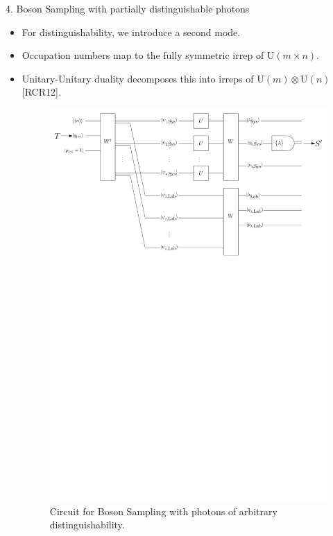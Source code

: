 \documentclass[]{templates/poster}
\begin{document}
\begin{frame}{}
\begin{columns}[t]
  \begin{column}{0.422\linewidth}
  
  \begin{block}{4. Boson Sampling with partially distinguishable photons}
  \begin{itemize}
  \item For distinguishability, we introduce a second mode.
  \item Occupation numbers map to the fully symmetric irrep of $\textrm{U}(m \times n)$.
  \item Unitary-Unitary duality decomposes this into irreps of $\textrm{U}(m)\otimes \textrm{U}(n)$ [RCR12].
  \begin{center}
  \begin{figure}
  \includegraphics[width=0.75\linewidth]{noisy_circuit_rep2}
  \caption{\label{fig:noisy-circuit} Circuit for Boson Sampling with photons of arbitrary distinguishability.}
  \end{figure}
  \end{center}
  \end{itemize}
  \end{block}
  

\end{column}
\end{columns}
\end{frame}
\end{document}
